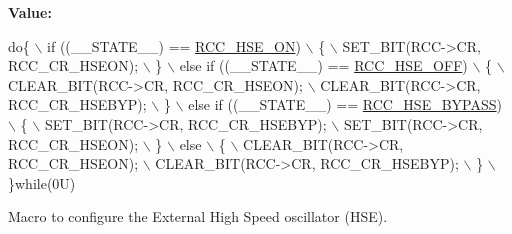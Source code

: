 {\bfseries Value\+:}
\begin{DoxyCode}
\textcolor{keywordflow}{do}\{                                                     \(\backslash\)
                      if ((\_\_STATE\_\_) == \hyperlink{group___r_c_c___h_s_e___config_gabc4f70a44776c557af20496b04d9a9db}{RCC\_HSE\_ON})                        \(\backslash\)
                      \{                                                     \(\backslash\)
                        SET\_BIT(RCC->CR, RCC\_CR\_HSEON);                     \(\backslash\)
                      \}                                                     \(\backslash\)
                      else \textcolor{keywordflow}{if} ((\_\_STATE\_\_) == \hyperlink{group___r_c_c___h_s_e___config_ga1616626d23fbce440398578855df6f97}{RCC\_HSE\_OFF})                  \(\backslash\)
                      \{                                                     \(\backslash\)
                        CLEAR\_BIT(RCC->CR, RCC\_CR\_HSEON);                   \(\backslash\)
                        CLEAR\_BIT(RCC->CR, RCC\_CR\_HSEBYP);                  \(\backslash\)
                      \}                                                     \(\backslash\)
                      else \textcolor{keywordflow}{if} ((\_\_STATE\_\_) == \hyperlink{group___r_c_c___h_s_e___config_ga5ca515db2d5c4d5bdb9ee3d154df2704}{RCC\_HSE\_BYPASS})               \(\backslash\)
                      \{                                                     \(\backslash\)
                        SET\_BIT(RCC->CR, RCC\_CR\_HSEBYP);                    \(\backslash\)
                        SET\_BIT(RCC->CR, RCC\_CR\_HSEON);                     \(\backslash\)
                      \}                                                     \(\backslash\)
                      else                                                  \(\backslash\)
                      \{                                                     \(\backslash\)
                        CLEAR\_BIT(RCC->CR, RCC\_CR\_HSEON);                   \(\backslash\)
                        CLEAR\_BIT(RCC->CR, RCC\_CR\_HSEBYP);                  \(\backslash\)
                      \}                                                     \(\backslash\)
                    \}\textcolor{keywordflow}{while}(0U)
\end{DoxyCode}


Macro to configure the External High Speed oscillator (H\+SE). 

